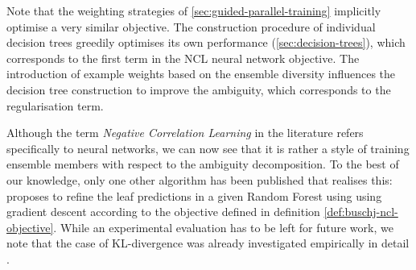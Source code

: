 \documentclass[../main.tex]{subfiles}
\begin{document}
Note that the weighting strategies of \cref{sec:guided-parallel-training} implicitly optimise a very similar objective. The construction procedure of individual decision trees greedily optimises its own performance (\cf \ref{sec:decision-trees}), which corresponds to the first term in the NCL neural network objective. The introduction of example weights based on the ensemble diversity influences the decision tree construction to improve the ambiguity, which corresponds to the regularisation term. 

Although the term \textit{Negative Correlation Learning} in the literature refers specifically to neural networks, we can now see that it is rather a style of training ensemble members with respect to the ambiguity decomposition.
To the best of our knowledge, only one other algorithm has been published that realises this: \citeauthor{buschjager_ThereNoDoubleDescent_2021} \cite{buschjager_ThereNoDoubleDescent_2021} proposes to refine the leaf predictions in a given Random Forest using using gradient descent according to the objective defined in definition \ref{def:buschj-ncl-objective}.
While an experimental evaluation has to be left for future work, we note that the case of KL-divergence was already investigated empirically in detail \cite{webb_EnsembleNotEnsemble_2019}.





\end{document}

